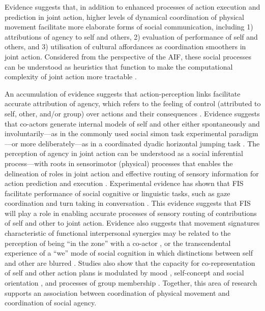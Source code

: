 \begin{CJK}{UTF8}{gbsn}
Evidence suggests that, in addition to enhanced processes of action execution and prediction in joint action, higher levels of dynamical coordination of physical movement facilitate more elaborate forms of social communication, including 1) attributions of agency to self and others,  2) evaluation of performance of self and others, and 3) utilisation of cultural affordances as coordination smoothers in joint action. Considered from the perspective of the AIF, these social processes can be understood as heuristics that function to make the computational complexity of joint action more tractable \citep{Moutoussis2014}.

An accumulation of evidence suggests that action-perception links facilitate accurate attribution of agency, which refers to the feeling of control (attributed to self, other, and/or group) over actions and their consequences \citep{Moore2016}.
Evidence suggests that co-actors generate internal models of self and other either spontaneously and involuntarily---as in the commonly used social simon task experimental paradigm \citep{Sebanz2003,Atmaca2008}---or more deliberately---as in a coordinated dyadic horizontal jumping task \citep{Vesper2012}.  The perception of agency in joint action can be understood as a social inferential process---with roots in sensorimotor (physical) processes that enables the delineation of roles in joint action and effective routing of sensory information for action prediction and execution \citep{Sato2008,Friston2015,Kelso2016}.  Experimental evidence has shown that FIS facilitate performance of social cognitive or linguistic tasks, such as gaze coordination and turn taking in conversation \citep{Miles2010,Richardson2005,Shockley2009}.  This evidence suggests that FIS will play a role in enabling accurate processes of sensory routing of contributions of self and other to joint action.
Evidence also suggests that movement signatures characteristic of functional interpersonal synergies may be related to the perception of  being ``in the zone'' with a co-actor \citep{Noy2011,Noy2015,Hart2014}, or the transcendental experience of a ``we'' mode of social cognition in which distinctions between self and other are blurred \citep{Gallotti2013}.  Studies also show that the capacity for co-representation of self and other action plans is modulated by mood \citep[positive or negative affect, see][]{Kuhbandner2010}, self-concept and social orientation \citep{Colzato2012,Colzato2012a}, and processes of group membership \citep{DeBruijn2008,Aquino2015}.  Together, this area of research supports an association between coordination of physical movement and coordination of social agency.


\end{CJK}
